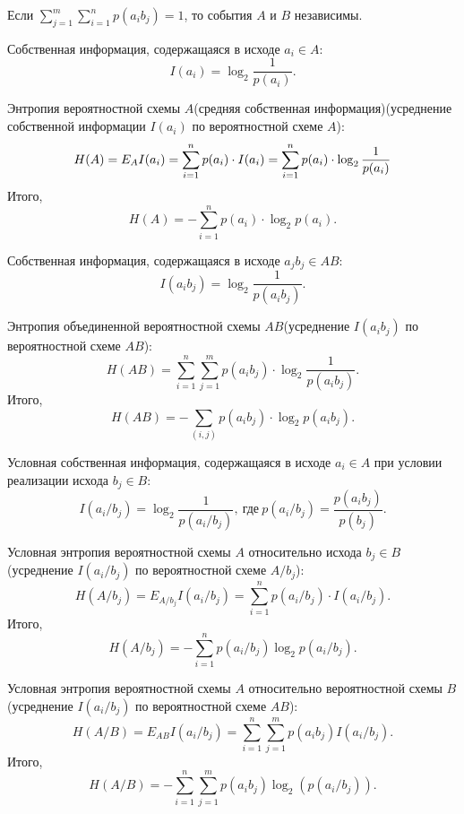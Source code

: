\documentclass{article}
\begin{document}
Если $\sum\limits_{j=1}^{m}\sum\limits_{i=1}^{n}p(a_ib_j) = 1$, то события $A$ и $B$ независимы.

\opr Собственная информация, содержащаяся в исходе $a_i \in A$:
$$
I(a_i) = \log_2{\frac{1}{p(a_i)}}.
$$

\opr Энтропия вероятностной схемы $A$(средняя собственная информация)(усреднение собственной информации $I(a_i)$ по вероятностной схеме $A$):
$$
    H(A) = E_A I(a_i) = \sum_{i=1}^{n} p(a_i) \cdot I(a_i) = \sum_{i=1}^{n} p(a_i) \cdot \log_2{\frac{1}{p(a_i)}}\\
$$
Итого,
$$
    H(A) = - \sum_{i=1}^{n} p(a_i) \cdot \log_2{p(a_i)}.
$$

\opr Собственная информация, содержащаяся в исходе $a_jb_j \in AB$:
$$
I(a_ib_j) = \log_2{\frac{1}{p(a_ib_j)}}.
$$

\opr Энтропия объединенной вероятностной схемы $AB$(усреднение $I(a_ib_j)$ по вероятностной схеме $AB$):
$$
H(AB) = \sum_{i=1}^{n}\sum_{j=1}^{m} p(a_ib_j)\cdot \log_2{\frac{1}{p(a_ib_j)}}.
$$
Итого,
$$
H(AB) = - \sum_{(i, j)} p(a_ib_j) \cdot \log_2{p(a_ib_j)}.
$$

\opr Условная собственная информация, содержащаяся в исходе $a_i \in A$ при условии реализации исхода $b_j \in B$:
$$
I(a_i / b_j) = \log_2{\frac{1}{p(a_i / b_j)}},\ \text{где}\  p(a_i/b_j) = \frac{p(a_ib_j)}{p(b_j)}.
$$

\opr Условная энтропия вероятностной схемы $A$ относительно исхода $b_j \in B$(усреднение $I(a_i/b_j)$ по вероятностной схеме $A/b_j$):
$$
H(A/b_j) = E_{A/b_j} I(a_i/b_j) = \sum_{i=1}^{n}p(a_i/b_j) \cdot I(a_i/b_j).
$$
Итого,
$$
H(A/b_j) = - \sum_{i=1}^{n} p(a_i / b_j) \log_2{p(a_i / b_j)}.
$$

\opr Условная энтропия вероятностной схемы $A$ относительно вероятностной схемы $B$ (усреднение $I(a_i/b_j)$ по вероятностной схеме $AB$):
$$
H(A/B) = E_{AB} I(a_i/b_j) = \sum_{i=1}^{n} \sum_{j=1}^{m} p(a_ib_j) I(a_i/b_j).
$$
Итого,
$$
H(A/B) = - \sum_{i=1}^{n} \sum_{j=1}^{m} p(a_ib_j) \log_2(p(a_i/b_j)).
$$
\end{document}
